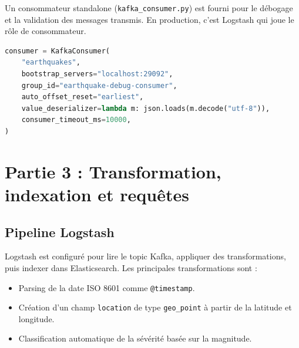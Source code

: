\documentclass[12pt,a4paper]{article}
\begin{document}
Un consommateur standalone (\texttt{kafka\_consumer.py}) est fourni pour le débogage et la validation des messages transmis. En production, c'est Logstash qui joue le rôle de consommateur.

\begin{lstlisting}[language=Python, caption={Configuration du consommateur Kafka}]
consumer = KafkaConsumer(
    "earthquakes",
    bootstrap_servers="localhost:29092",
    group_id="earthquake-debug-consumer",
    auto_offset_reset="earliest",
    value_deserializer=lambda m: json.loads(m.decode("utf-8")),
    consumer_timeout_ms=10000,
)
\end{lstlisting}

\section{Partie 3 : Transformation, indexation et requêtes}

\subsection{Pipeline Logstash}

Logstash est configuré pour lire le topic Kafka, appliquer des transformations, puis indexer dans Elasticsearch. Les principales transformations sont :

\begin{itemize}[noitemsep]
    \item Parsing de la date ISO 8601 comme \texttt{@timestamp}.
    \item Création d'un champ \texttt{location} de type \texttt{geo\_point} à partir de la latitude et longitude.
    \item Classification automatique de la sévérité basée sur la magnitude.
\end{itemize}
\end{document}

